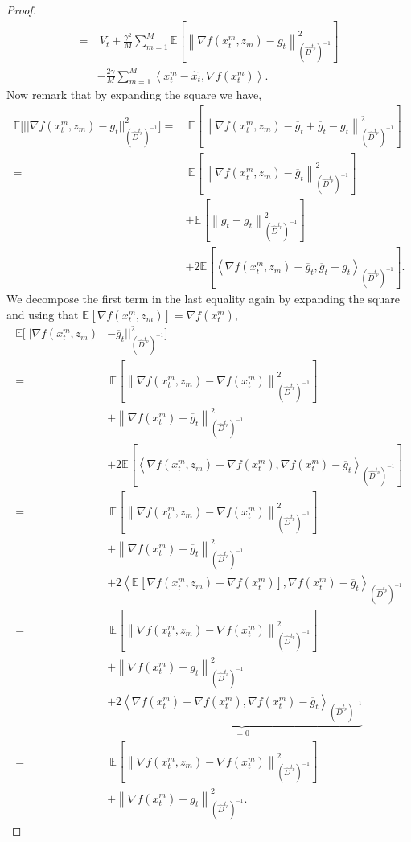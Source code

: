 \documentclass[sn-mathphys,Numbered]{sn-jnl}%
\renewcommand{\|}{\parallel}
\newcommand\ec[2][]{\ensuremath{\mathbb{E}_{#1} \left[#2\right]}}
\newcommand\ecn[3][]{\ec[#1]{\norm{#2}^2_{#3}}}
\newcommand\ev[1]{\left \langle #1 \right \rangle}
\newcommand{\norm}[1]{\left\lVert#1\right\rVert}
\newcommand{\sqn}[1]{{\left\lVert#1\right\rVert}^2}
\renewcommand {\*} {\ast}
\begin{document}
\begin{proof}
\begin{align}
         \label{iterate-variance-bound-recursion}
         =&\ V_t + \frac{\gamma^2}{M} \sum\limits_{m=1}^M \ecn{\nabla f(x_t^m, z_m) - g_t}{(\hat{D}^{t_p})^{-1}} \nonumber \\ &- \frac{2 \gamma}{M} \sum\limits_{m=1}^M \ev{x_t^m - \hat{x}_t, \nabla f(x_t^m)}.
     \end{align}
     Now remark that by expanding the square we have,
     \begin{align}
         \label{iterate-gradient-variance-bound-1}
         \mathbb{E}\Big[ ||\nabla f(x_t^m, z_m) - g_t||^2_{(\hat{D}^{t_p})^{-1}}\Big] \nonumber =&\
         \ecn{\nabla f(x_t^m, z_m) - \overline{g}_t + \overline{g}_t - g_t}{(\hat{D}^{t_p})^{-1}} \nonumber \\ =&\
         \ecn{\nabla f(x_t^m, z_m) - \overline{g}_t}{(\hat{D}^{t_p})^{-1}} \nonumber \\&+ \ecn{\overline{g}_t - g_t}{(\hat{D}^{t_p})^{-1}} \nonumber \\ &+ 2 \ec{\ev{\nabla f(x_t^m, z_m) - \overline{g}_t, \overline{g}_t - g_t}_{(\hat{D}^{t_p})^{-1}}}.
     \end{align}
     We decompose the first term in the last equality again by expanding the square and using that $\ec{\nabla f(x_t^m, z_m)} = \nabla f(x_t^m)$,
     \begin{align*}
         \mathbb{E}\Big[ ||\nabla f(x_t^m, z_m) &- \overline{g}_t||^2_{(\hat{D}^{t_p})^{-1}}\Big]  \\ 
         =&\ \ecn{\nabla f(x_t^m, z_m) - \nabla f(x_t^m)}{(\hat{D}^{t_p})^{-1}} \\ &+ \sqn{\nabla f(x_t^m) - \overline{g}_t}_{(\hat{D}^{t_p})^{-1}} \\ &+ 2 \ec{\ev{ \nabla f(x_t^m, z_m) - \nabla f(x_t^m), \nabla f(x_t^m) - \overline{g}_t }_{(\hat{D}^{t_p})^{-1}}} \\
         =&\ \ecn{\nabla f(x_t^m, z_m) - \nabla f(x_t^m)}{(\hat{D}^{t_p})^{-1}} \\ &+ \sqn{\nabla f(x_t^m) - \overline{g}_t}_{(\hat{D}^{t_p})^{-1}} \\ &+ 2 \ev{\ec{ \nabla f(x_t^m, z_m) - \nabla f(x_t^m)}, \nabla f(x_t^m) - \overline{g}_t }_{(\hat{D}^{t_p})^{-1}} \\
         =&\ \ecn{\nabla f(x_t^m, z_m) - \nabla f(x_t^m)}{(\hat{D}^{t_p})^{-1}} \\ &+ \sqn{\nabla f(x_t^m) - \overline{g}_t}_{(\hat{D}^{t_p})^{-1}} \\ &+ 2 \underbrace{\ev{\nabla f(x_t^m) - \nabla f(x_t^m), \nabla f(x_t^m) - \overline{g}_t }_{(\hat{D}^{t_p})^{-1}}}_{=0} \\ =&\ \ecn{\nabla f(x_t^m, z_m) - \nabla f(x_t^m)}{(\hat{D}^{t_p})^{-1}} \\ &+ \sqn{\nabla f(x_t^m) - \overline{g}_t}_{(\hat{D}^{t_p})^{-1}}.

\end{align*}
\end{proof}
\end{document}
